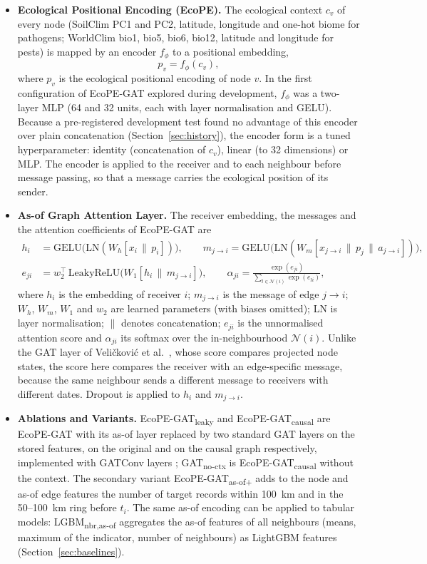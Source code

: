 \documentclass[a4paper,fleqn]{cas-sc}
\newcommand{\Masofplus}{\mbox{EcoPE-GAT\textsubscript{as-of+}}}
\newcommand{\Mcausal}{\mbox{EcoPE-GAT\textsubscript{causal}}}
\newcommand{\Mleaky}{\mbox{EcoPE-GAT\textsubscript{leaky}}}
\newcommand{\Mnoctx}{\mbox{GAT\textsubscript{no-ctx}}}
\newcommand{\Lasof}{\mbox{LGBM\textsubscript{nbr,as-of}}}
\begin{document}
\begin{itemize}[leftmargin=1.4em]
\item \textbf{Ecological Positional Encoding (EcoPE).} The ecological context $c_v$ of every node (SoilClim PC1 and PC2, latitude, longitude and one-hot biome for pathogens; WorldClim bio1, bio5, bio6, bio12, latitude and longitude for pests) is mapped by an encoder $f_\phi$ to a positional embedding,
\begin{equation}
p_v = f_\phi(c_v),
\end{equation}
where $p_v$ is the ecological positional encoding of node $v$. In the first configuration of EcoPE-GAT explored during development, $f_\phi$ was a two-layer MLP (64 and 32 units, each with layer normalisation and GELU). Because a pre-registered development test found no advantage of this encoder over plain concatenation (Section~\ref{sec:history}), the encoder form is a tuned hyperparameter: identity (concatenation of $c_v$), linear (to 32 dimensions) or MLP. The encoder is applied to the receiver and to each neighbour before message passing, so that a message carries the ecological position of its sender.

\item \textbf{As-of Graph Attention Layer.} The receiver embedding, the messages and the attention coefficients of EcoPE-GAT are
\begin{align}
h_i &= \mathrm{GELU}\big(\mathrm{LN}(W_h [x_i \,\|\, p_i])\big), \qquad
m_{j \to i} = \mathrm{GELU}\big(\mathrm{LN}(W_m [x_{j \to i} \,\|\, p_j \,\|\, a_{j \to i}])\big), \label{eq:msg}\\
e_{ji} &= w_2^\top\, \mathrm{LeakyReLU}\big(W_1 [h_i \,\|\, m_{j \to i}]\big), \qquad
\alpha_{ji} = \frac{\exp(e_{ji})}{\sum_{l \in \mathcal{N}(i)} \exp(e_{li})}, \label{eq:att}
\end{align}
where $h_i$ is the embedding of receiver $i$; $m_{j \to i}$ is the message of edge $j \to i$; $W_h$, $W_m$, $W_1$ and $w_2$ are learned parameters (with biases omitted); LN is layer normalisation; $\|$ denotes concatenation; $e_{ji}$ is the unnormalised attention score and $\alpha_{ji}$ its softmax over the in-neighbourhood $\mathcal{N}(i)$. Unlike the GAT layer of Veli\v{c}kovi\'c et al.~\citep{velickovic2018}, whose score compares projected node states, the score here compares the receiver with an edge-specific message, because the same neighbour sends a different message to receivers with different dates. Dropout is applied to $h_i$ and $m_{j \to i}$.

\item \textbf{Ablations and Variants.} \Mleaky{} and \Mcausal{} are EcoPE-GAT with its as-of layer replaced by two standard GAT layers on the stored features, on the original and on the causal graph respectively, implemented with GATConv layers \citep{velickovic2018,fey2019}; \Mnoctx{} is \Mcausal{} without the context. The secondary variant \Masofplus{} adds to the node and as-of edge features the number of target records within 100~km and in the 50--100~km ring before $t_i$. The same as-of encoding can be applied to tabular models: \Lasof{} aggregates the as-of features of all neighbours (means, maximum of the indicator, number of neighbours) as LightGBM features (Section~\ref{sec:baselines}).


\end{itemize}
\end{document}
